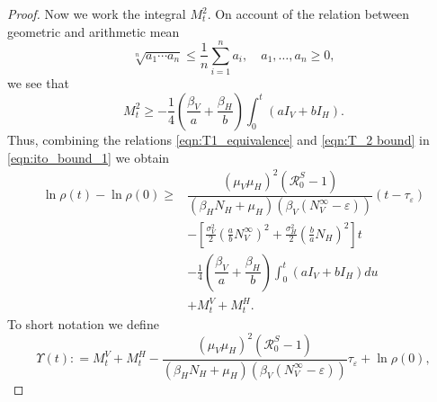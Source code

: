 \begin{proof}
    Now we work the integral $M_t^2$. 
    On account of the relation between geometric and arithmetic mean
    $$
        \sqrt[n]{a_1  \cdots a_n}
        \leq
        \dfrac{1}{n}
        \sum_{i=1} ^ n
            a_i,
        \quad
        a_1,\dots, a_n \geq 0,
    $$
    we see that
    \begin{equation} \label{eqn:T_2 bound}
        M_t^2\geq
        -\frac{1}{4}
        \left(
            \dfrac{\beta_V}{a}
            +
            \dfrac{\beta_H}{b}
        \right)
        \int_{0} ^ t
        \left(
            a I_V + b I_H
        \right) .
    \end{equation}
    Thus, combining the relations 
    \eqref{eqn:T1_equivalence} and \eqref{eqn:T_2 bound} in 
    \eqref{eqn:ito_bound_1} we obtain
    \begin{equation} \label{eqn:ito_wit_Mi_bounds}
        \begin{aligned}
            \ln \rho(t) 
            -
            \ln \rho(0)
            \geq &
                \dfrac{
                    (\mu_V \mu_H) ^ 2 (\mathcal{R}_0 ^ S - 1)
                }{
                    (\beta_H N_H + \mu_H) 
                    (\beta_V \left(N_V ^ {\infty} -\varepsilon\right))
                }
            (t - \tau_\varepsilon)
            \\
            & -
            \left[
                \frac{\sigma_V ^ 2}{2}
                \left(
                    \frac{a}{b} N_V ^ \infty
                \right) ^2
                +
                \frac{\sigma_H ^ 2}{2}
                \left(
                    \frac{b}{a}
                    N_H
                \right) ^ 2
            \right]
            t
            \\
            &
            -\frac{1}{4}
            \left(
                \dfrac{\beta_V}{a}
                +
                \dfrac{\beta_H}{b}
            \right)
            \int_{0} ^ t
                \left(
                    a I_V + b I_H
                \right)
                du
            \\
            & +
            M_t ^ V + M_t ^ H.
        \end{aligned}
    \end{equation}
    To short notation we define
    $$
        \varUpsilon(t): =
            M_t ^ V + M_t^H
            -
            \dfrac{
                (\mu_V \mu_H) ^ 2 (\mathcal{R}_0 ^ S - 1)
            }{
                (\beta_H N_H + \mu_H) 
                (\beta_V \left(N_V ^ {\infty} -\varepsilon\right))
            }\tau_\varepsilon + \ln \rho(0),
$$
\end{proof}
